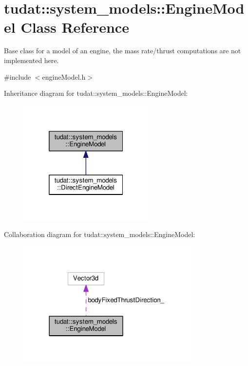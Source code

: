 \hypertarget{classtudat_1_1system__models_1_1EngineModel}{}\section{tudat\+:\+:system\+\_\+models\+:\+:Engine\+Model Class Reference}
\label{classtudat_1_1system__models_1_1EngineModel}


Base class for a model of an engine, the mass rate/thrust computations are not implemented here.  




{\ttfamily \#include $<$engine\+Model.\+h$>$}



Inheritance diagram for tudat\+:\+:system\+\_\+models\+:\+:Engine\+Model\+:
\nopagebreak
\begin{figure}[H]
\begin{center}
\leavevmode
\includegraphics[width=193pt]{classtudat_1_1system__models_1_1EngineModel__inherit__graph}
\end{center}
\end{figure}


Collaboration diagram for tudat\+:\+:system\+\_\+models\+:\+:Engine\+Model\+:
\nopagebreak
\begin{figure}[H]
\begin{center}
\leavevmode
\includegraphics[width=258pt]{classtudat_1_1system__models_1_1EngineModel__coll__graph}
\end{center}
\end{figure}

